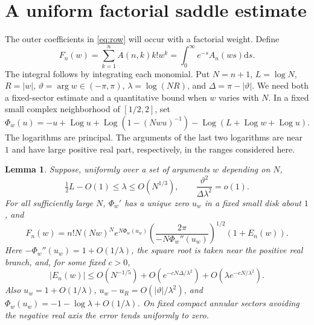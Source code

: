 \documentclass[11pt]{article}
\newtheorem{lemma}{Lemma}
\DeclareMathOperator{\Arg}{arg}
\newcommand{\dd}{\mathrm d}
\newcommand{\Log}{\operatorname{Log}}
\begin{document}
\section{A uniform factorial saddle estimate}\label{sec:saddle}

The outer coefficients in \eqref{eq:row} will occur with a factorial weight. Define
\begin{equation}\label{eq:F}
 F_n(w)=\sum_{k=1}^n A(n,k)k!w^k=\int_0^\infty e^{-s}A_n(ws)\dd s.
\end{equation}
The integral follows by integrating each monomial. Put \(N=n+1\), \(L=\log N\), \(R=|w|\), \(\vartheta=\Arg w\in(-\pi,\pi)\), \(\lambda=\log(NR)\), and \(\Delta=\pi-|\vartheta|\). We need both a fixed-sector estimate and a quantitative bound when \(w\) varies with \(N\). In a fixed small complex neighborhood of \([1/2,2]\), set
\begin{equation}\label{eq:phase}
 \Phi_w(u)=-u+\Log u+\Log(1-(Nwu)^{-1})-\Log(L+\Log w+\Log u).
\end{equation}
The logarithms are principal. The arguments of the last two logarithms are near \(1\) and have large positive real part, respectively, in the ranges considered here.

\begin{lemma}\label{lem:saddle}
Suppose, uniformly over a set of arguments \(w\) depending on \(N\),
\begin{equation}\label{eq:saddle-domain}
 \tfrac12 L-O(1)\le\lambda\le O(N^{1/3}),\qquad
 \frac{\vartheta^2}{\Delta\lambda^2}=o(1).
\end{equation}
For all sufficiently large \(N\), \(\Phi_w'\) has a unique zero \(u_w\) in a fixed small disk about \(1\), and
\begin{equation}\label{eq:mainF}
 F_n(w)=n!N(Nw)^N e^{N\Phi_w(u_w)}
       \left(\frac{2\pi}{-N\Phi_w''(u_w)}\right)^{1/2}(1+E_n(w)).
\end{equation}
Here \(-\Phi_w''(u_w)=1+O(1/\lambda)\), the square root is taken near the positive real branch, and, for some fixed \(c>0\),
\begin{equation}\label{eq:saddleerror}
 |E_n(w)|\le O(N^{-1/5})+O(e^{-cN\Delta/\lambda^2})
                         +O(\lambda e^{-cN/\lambda^2}).
\end{equation}
Also \(u_w=1+O(1/\lambda)\), \(u_w-u_R=O(|\vartheta|/\lambda^2)\), and \(\Phi_w(u_w)=-1-\log\lambda+O(1/\lambda)\). On fixed compact annular sectors avoiding the negative real axis the error tends uniformly to zero.
\end{lemma}
\end{document}
